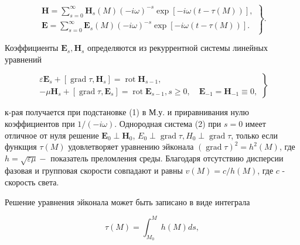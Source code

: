 \documentclass[10pt]{article}
\begin{document}
\[

\left.\begin{array}{c}

\boldsymbol{H}=\sum_{s=0}^{\infty} \boldsymbol{H}_{s}(M)(-i \omega)^{-s} \exp [-i \omega(t-\tau(M))], \\

\boldsymbol{E}=\sum_{s=0}^{\infty} \boldsymbol{E}_{s}(M)(-i \omega)^{-s} \exp [-i \omega(t-\tau(M))] .

\end{array}\right\} .

\]



Коэффициенты $\boldsymbol{E}_{s}, \boldsymbol{H}_{s}$ определяются из рекуррентной системы линейных уравнений



\[

\left.\begin{array}{l}

\varepsilon \boldsymbol{E}_{s}+\left[\operatorname{grad} \tau, \boldsymbol{H}_{s}\right]=\operatorname{rot} \boldsymbol{H}_{s-1}, \\

-\mu \boldsymbol{H}_{s}+\left[\operatorname{grad} \tau, \boldsymbol{E}_{s}\right]=\operatorname{rot} \boldsymbol{E}_{s-1}, s \geqslant 0, \quad \boldsymbol{E}_{-1}=\boldsymbol{H}_{-1} \equiv 0,

\end{array}\right\}

\]



к-рая получается при подстановке (1) в М.у. и приравнивания нулю коэффициентов при $1 /(-i \omega)$. Однородная система (2) при $s=0$ имеет отличное от нуля решение $\boldsymbol{E}_{0} \perp \boldsymbol{H}_{0}$, $E_{0} \perp \operatorname{grad} \tau, H_{0} \perp \operatorname{grad} \tau$, только если функщия $\tau(M)$ удовлетворяет уравнению эйконала $(\operatorname{grad} \tau)^{2}=h^{2}(M)$, где $h=\sqrt{\varepsilon \mu}-$ показатель преломления среды. Благодаря отсутствию дисперсии фазовая и групповая скорости совпадают и равны $v(M)=c / h(M)$, где $c$ - скорость света.



Решение уравнения эйконала может быть записано в виде интеграла



\[

\tau(M)=\int_{M_{0}}^{M} h(M) d s,

\]
\end{document}

